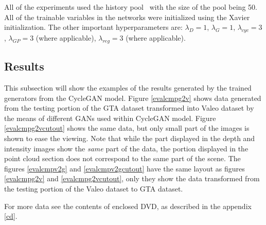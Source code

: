 All of the experiments used the history pool~\cite{historypool} with the size of the pool being 50. All of the trainable variables in the networks were initialized using the Xavier~\cite{xavier} initialization. The other important hyperparameters are: $\lambda_D = 1$, $\lambda_G = 1$, $\lambda_{cyc} = 3$, $\lambda_{GP} = 3$ (where applicable), $\lambda_{reg} = 3$ (where applicable).

\subsection{Results}

This subsection will show the examples of the results generated by the trained generators from the CycleGAN model. Figure \ref{evalcmpg2v} shows data generated from the testing portion of the GTA dataset transformed into Valeo dataset by the means of different GANs used within CycleGAN model. Figure \ref{evalcmpg2vcutout} shows the same data, but only small part of the images is shown to ease the viewing. Note that while the part displayed in the depth and intensity images show the {\em same} part of the data, the portion displayed in the point cloud section does not correspond to the same part of the scene. The figures \ref{evalcmpv2g} and \ref{evalcmpv2gcutout} have the same layout as figures \ref{evalcmpg2v} and \ref{evalcmpg2vcutout}, only they show the data transformed from the testing portion of the Valeo dataset to GTA dataset.

For more data see the contents of enclosed DVD, as described in the appendix \ref{cd}.

